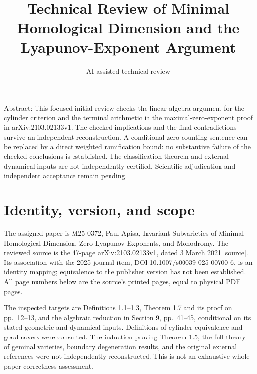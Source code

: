 \documentclass[10pt]{article}
\title{Technical Review of Minimal Homological Dimension and the Lyapunov-Exponent Argument}
\author{AI-assisted technical review}
\date{}
\begin{document}
\maketitle
Abstract: This focused initial review checks the linear-algebra argument for the cylinder criterion and the terminal arithmetic in the maximal-zero-exponent proof in arXiv:2103.02133v1. The checked implications and the final contradictions survive an independent reconstruction. A conditional zero-counting sentence can be replaced by a direct weighted ramification bound; no substantive failure of the checked conclusions is established. The classification theorem and external dynamical inputs are not independently certified. Scientific adjudication and independent acceptance remain pending.\par
\section*{Identity, version, and scope}
The assigned paper is M25-0372, Paul Apisa, Invariant Subvarieties of Minimal Homological Dimension, Zero Lyapunov Exponents, and Monodromy. The reviewed source is the 47-page arXiv:2103.02133v1, dated 3 March 2021 [source]. Its association with the 2025 journal item, DOI 10.1007/s00039-025-00700-6, is an identity mapping; equivalence to the publisher version has not been established. All page numbers below are the source’s printed pages, equal to physical PDF pages.\par
The inspected targets are Definitions 1.1–1.3, Theorem 1.7 and its proof on pp. 12–13, and the algebraic reduction in Section 9, pp. 41–45, conditional on its stated geometric and dynamical inputs. Definitions of cylinder equivalence and good covers were consulted. The induction proving Theorem 1.5, the full theory of geminal varieties, boundary degeneration results, and the original external references were not independently reconstructed. This is not an exhaustive whole-paper correctness assessment.\par
\end{document}

